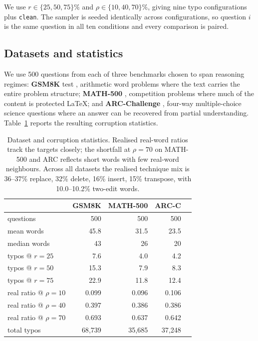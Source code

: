 \documentclass[11pt]{article}
\begin{document}
We use $r\in\{25,50,75\}\%$ and $\rho\in\{10,40,70\}\%$, giving nine typo
configurations plus \texttt{clean}. The sampler is seeded identically across
configurations, so question $i$ is the same question in all ten conditions and
every comparison is paired.

\subsection{Datasets and statistics}
\label{sec:data}

We use 500 questions from each of three benchmarks chosen to span reasoning
regimes: \textbf{GSM8K} test \citep{cobbe2021}, arithmetic word problems where
the text carries the entire problem structure; \textbf{MATH-500}
\citep{hendrycks2021,lightman2024}, competition problems where much of the
content is protected \LaTeX{}; and \textbf{ARC-Challenge} \citep{clark2018},
four-way multiple-choice science questions where an answer can be recovered from
partial understanding. Table~\ref{tab:datastats} reports the resulting
corruption statistics.

\begin{table}[t]
\centering\small
\begin{tabular}{lrrrr}
\toprule
 & GSM8K & MATH-500 & ARC-C \\
\midrule
questions            & 500  & 500  & 500 \\
mean words           & 45.8 & 31.5 & 23.5 \\
median words         & 43   & 26   & 20 \\
\midrule
typos @ $r{=}25$     & 7.6  & 4.0  & 4.2 \\
typos @ $r{=}50$     & 15.3 & 7.9  & 8.3 \\
typos @ $r{=}75$     & 22.9 & 11.8 & 12.4 \\
\midrule
real ratio @ $\rho{=}10$ & 0.099 & 0.096 & 0.106 \\
real ratio @ $\rho{=}40$ & 0.397 & 0.386 & 0.386 \\
real ratio @ $\rho{=}70$ & 0.693 & 0.637 & 0.642 \\
\midrule
total typos          & 68{,}739 & 35{,}685 & 37{,}248 \\
\bottomrule
\end{tabular}
\caption{Dataset and corruption statistics. Realised real-word ratios track the
targets closely; the shortfall at $\rho{=}70$ on MATH-500 and ARC reflects short
words with few real-word neighbours. Across all datasets the realised technique
mix is 36--37\% replace, 32\% delete, 16\% insert, 15\% transpose, with
10.0--10.2\% two-edit words.}
\label{tab:datastats}
\end{table}
\end{document}
